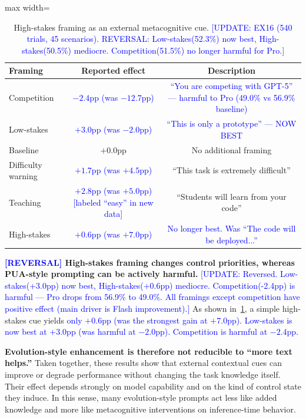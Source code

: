 \documentclass{article}
\newcommand{\blue}[1]{\textcolor{blue}{#1}}
\newcommand{\nbf}[1]{{\noindent \textbf{#1}}}
\begin{document}
\begin{table}[h]
\centering
\caption{High-stakes framing as an external metacognitive cue. \blue{[UPDATE: EX16 (540 trials, 45 scenarios). REVERSAL: Low-stakes(52.3\%) now best, High-stakes(50.5\%) mediocre. Competition(51.5\%) no longer harmful for Pro.]}}
\label{tab:stakes_framing}
\begin{adjustbox}{max width=\textwidth}
\begin{tabular}{lcc}
\toprule
\textbf{Framing} & \textbf{Reported effect} & \textbf{Description} \\
\midrule
Competition & \blue{$-2.4$pp (was $-12.7$pp)} & \blue{``You are competing with GPT-5'' --- harmful to Pro (49.0\% vs 56.9\% baseline)} \\
Low-stakes & \blue{$+3.0$pp (was $-2.0$pp)} & \blue{``This is only a prototype'' --- NOW BEST} \\
Baseline & $+0.0$pp & No additional framing \\
Difficulty warning & \blue{$+1.7$pp (was $+4.5$pp)} & ``This task is extremely difficult'' \\
Teaching & \blue{$+2.8$pp (was $+5.0$pp) [labeled ``easy'' in new data]} & ``Students will learn from your code'' \\
\cellcolor{bestRow}High-stakes & \cellcolor{bestRow}\blue{$+0.6$pp (was $+7.0$pp)} & \cellcolor{bestRow}\blue{No longer best. Was ``The code will be deployed...''} \\
\bottomrule
\end{tabular}
\end{adjustbox}
\end{table}

\nbf{\blue{[REVERSAL]} High-stakes framing changes control priorities, whereas PUA-style prompting can be actively harmful.}
\blue{[UPDATE: Reversed. Low-stakes(+3.0pp) now best, High-stakes(+0.6pp) mediocre. Competition(-2.4pp) is harmful --- Pro drops from 56.9\% to 49.0\%. All framings except competition have positive effect (main driver is Flash improvement).]}
As shown in~\cref{tab:stakes_framing}, a simple high-stakes cue yields \blue{only $+0.6$pp (was the strongest gain at $+7.0$pp)}. \blue{Low-stakes is now best at $+3.0$pp (was harmful at $-2.0$pp). Competition is harmful at $-2.4$pp.}

\nbf{Evolution-style enhancement is therefore not reducible to ``more text helps.''}
Taken together, these results show that external contextual cues can improve or degrade performance without changing the task knowledge itself. 
Their effect depends strongly on model capability and on the kind of control state they induce. 
In this sense, many evolution-style prompts act less like added knowledge and more like metacognitive interventions on inference-time behavior.
\end{document}
